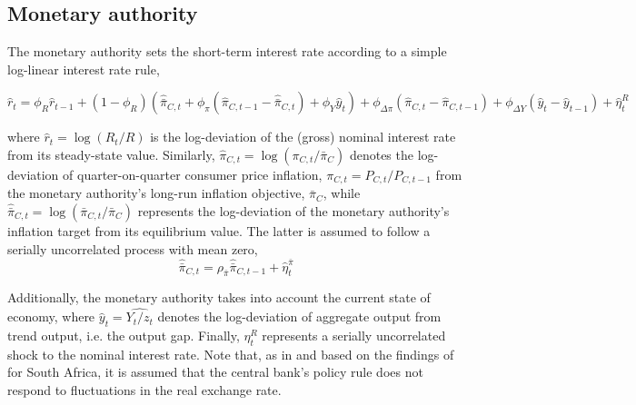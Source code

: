 \documentclass[a4paper,11pt]{article}
\numberwithin{equation}{section}
\begin{document}
	
	\subsection{Monetary authority}
	
	The monetary authority sets the short-term interest rate according to a simple log-linear interest rate rule,
	
	\begin{equation} \label{mon_pol}
	\hat{r}_t=\phi_R\hat{r}_{t-1}+(1-\phi_R)\left(\hat{\bar{\pi}}_{C,t}+\phi_{\pi}\left(\hat{\pi}_{C,t-1}-\hat{\bar{\pi}}_{C,t}\right)+\phi_Y\hat{y}_t\right)+\phi_{\Delta\pi}(\hat{\pi}_{C,t}-\hat{\pi}_{C,t-1})+\phi_{\Delta Y}(\hat{y}_t-\hat{y}_{t-1})+\hat{\eta}_t^R
	\end{equation}
	
	{\color{red}where $\hat{r}_t=\log\left(R_t/R\right)$ is the log-deviation of the (gross) nominal interest rate from its steady-state value. Similarly, $\hat{\pi}_{C,t}=\log\left(\pi_{C,t}/\bar{\pi}_C\right)$ denotes the log-deviation of quarter-on-quarter consumer price inflation, $\pi_{C,t}=P_{C,t}/P_{C,t-1}$ from the monetary authority's long-run inflation objective, $\bar{\pi}_C$, while $\hat{\bar{\pi}}_{C,t}=\log\left(\bar{\pi}_{C,t}/\bar{\pi}_C\right)$ represents the log-deviation of the monetary authority's inflation target from its equilibrium value. The latter is assumed to follow a serially uncorrelated process with mean zero,
	}
	\begin{equation}
	\hat{\bar{\pi}}_{C,t}=\rho_{\bar{\pi}}\hat{\bar{\pi}}_{C,t-1}+\hat{\eta}_t^{\bar{\pi}}
	\end{equation}
	
	Additionally, the monetary authority takes into account the current state of economy, where $\hat{y}_t=\widehat{Y_t/z_t}$ denotes the log-deviation of aggregate output from trend output, i.e. the output gap. Finally, $\eta_t^R$ represents a serially uncorrelated shock to the nominal interest rate. Note that, as in  and based on the findings of \cite{alpanda2010} for South Africa, it is assumed that the central bank's policy rule does not respond to fluctuations in the real exchange rate. 
	
	
\end{document}
